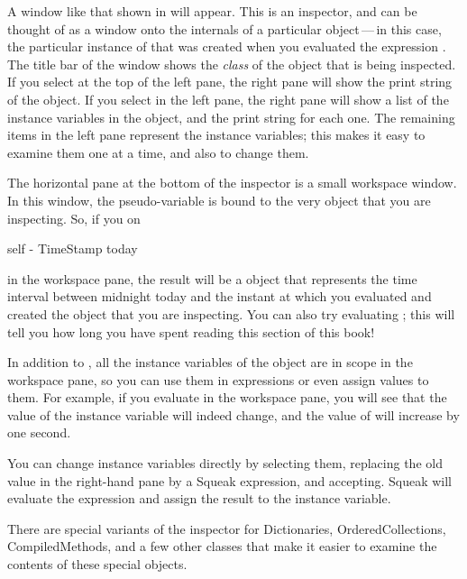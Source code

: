 \documentclass[a4paper,10pt,twoside]{book}
\begin{document}
A window like that shown in  will appear.
This is an inspector, and can be thought of as a window onto the internals of a particular object\,---\,in this case, the particular instance of  that was created when you evaluated the expression .
The title bar of the window shows the \emph{class} of the object that is being inspected.
If you select  at the top of the left pane, the right pane will show the print string of the object.
If you select  in the left pane, the right pane will show a list of the instance variables in the object, and the print string for each one.
The remaining items in the left pane represent the instance variables; this makes it easy to examine them one at a time, and also to change them.

The horizontal pane at the bottom of the inspector is a small workspace window.
In this window, the pseudo-variable  is bound to the very object that you are inspecting.
So, if you  on
\begin{code}{}
self - TimeStamp today
\end{code}
in the workspace pane, the result will be a  object that represents the time interval between midnight today and the instant at which you evaluated  and created the  object that you are inspecting.
You can also try evaluating ; this will tell you how long you have spent reading this section of this book!

In addition to , all the instance variables of the object are in scope in the workspace pane, so you can use them in expressions or even assign values to them.
For example, if you evaluate  in the workspace pane, you will see that the value of the  instance variable will indeed change, and the value of  will increase by one second.

You can change instance variables directly by selecting them, replacing the old value in the right-hand pane by a Squeak expression, and accepting.
Squeak will evaluate the expression and assign the result to the instance variable.

There are special variants of the inspector for Dictionaries, OrderedCollections, CompiledMethods, and a few other classes that make it easier to examine the contents of these special objects.
\end{document}
